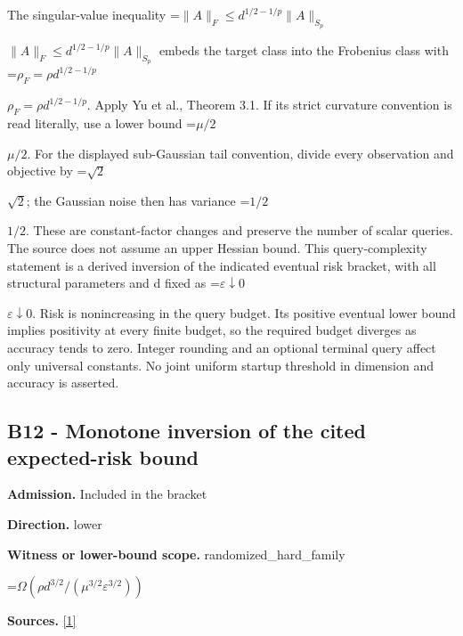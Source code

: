 \documentclass[10pt,a4paper]{article}
\newcommand{\AtlasMath}[1]{\par\begingroup\centering\setbox0=\hbox{$\displaystyle #1$}\ifdim\wd0>1.4\linewidth\typeout{ATLAS WIDE FORMULA: \the\wd0}\fi\ifdim\wd0>\linewidth\resizebox{\linewidth}{!}{\box0}\else\box0\fi\par\endgroup}
\newcommand{\AtlasInlineMath}[1]{\begingroup\setbox0=\hbox{$#1$}\ifdim\wd0>.4\linewidth\endgroup\AtlasMath{#1}\else\endgroup$#1$\fi}
\begin{document}
The singular-value inequality \AtlasInlineMath{\|A\|_F\le d^{1/2-1/p}\|A\|_{S_p}} embeds the target class into the Frobenius class with \AtlasInlineMath{\rho_F=\rho d^{1/2-1/p}}. Apply Yu et al., Theorem 3.1. If its strict curvature convention is read literally, use a lower bound \AtlasInlineMath{\mu/2}. For the displayed sub-Gaussian tail convention, divide every observation and objective by \AtlasInlineMath{\sqrt2}; the Gaussian noise then has variance \AtlasInlineMath{1/2}. These are constant-factor changes and preserve the number of scalar queries. The source does not assume an upper Hessian bound. This query-complexity statement is a derived inversion of the indicated eventual risk bracket, with all structural parameters and d fixed as \AtlasInlineMath{\varepsilon\downarrow0}. Risk is nonincreasing in the query budget. Its positive eventual lower bound implies positivity at every finite budget, so the required budget diverges as accuracy tends to zero. Integer rounding and an optional terminal query affect only universal constants. No joint uniform startup threshold in dimension and accuracy is asserted.



\subsection{B12 - Monotone inversion of the cited expected-risk bound}


\textbf{Admission.} Included in the bracket



\textbf{Direction.} lower



\textbf{Witness or lower-bound scope.} randomized\_hard\_family



\AtlasMath{\Omega(\rho d^{3/2}/(\mu^{3/2}\varepsilon^{3/2}))}


\textbf{Sources.} \href{https://papers.nips.cc/paper_files/paper/2024/file/b444ad72520a5f5c467343be88e352ed-Paper-Conference.pdf}{[1]}
\end{document}
